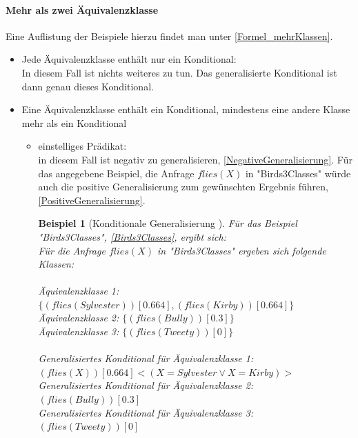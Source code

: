 \documentclass[draft]{scrreprt}
\newtheorem{Bsp}{Beispiel}[section]
\begin{document}
\paragraph{Mehr als zwei Äquivalenzklasse} 
Eine Auflistung der Beispiele hierzu findet man unter \ref{Formel_mehrKlassen}.
\begin{itemize}
	\item Jede Äquivalenzklasse enthält nur ein Konditional:\\
	In diesem Fall ist nichts weiteres zu tun. Das generalisierte Konditional ist dann genau dieses Konditional.
	\item Eine Äquivalenzklasse enthält ein Konditional, mindestens eine andere Klasse mehr als ein Konditional
	\begin{itemize}
		\item einstelliges Prädikat:\\
		 in diesem Fall ist negativ zu generalisieren, \ref{NegativeGeneralisierung}. Für das angegebene Beispiel, die Anfrage $ flies(X) $ in "{}Birds3Classes"{} würde auch die positive Generalisierung zum gewünschten Ergebnis führen, \ref{PositiveGeneralisierung}.
		\begin{Bsp}[Konditionale Generalisierung ]
			Für das Beispiel \\ "{}Birds3Classes"{}, \ref{Birds3Classes}, ergibt sich:\\
			Für die Anfrage $ flies(X) $ in "{}Birds3Classes"{} ergeben sich folgende Klassen:\\
			\\
			Äquivalenzklasse 1: $ \{(flies(Sylvester))[0.664], (flies(Kirby))[0.664]\}  $\\
			Äquivalenzklasse 2: $ \{(flies(Bully))[0.3]\} $\\
			Äquivalenzklasse 3: $ \{(flies(Tweety))[0]\} $\\
			\\
			\noindent
			Generalisiertes Konditional für Äquivalenzklasse 1:\\ $ (flies(X))[0.664]<(X = Sylvester \lor  X = Kirby)>$\\
			Generalisiertes  Konditional für Äquivalenzklasse 2:\\ $ (flies(Bully))[0.3] $\\
			Generalisiertes Konditional für Äquivalenzklasse 3: \\$ (flies(Tweety))[0] $\\
		

\end{Bsp}
\end{itemize}
\end{itemize}
\end{document}
